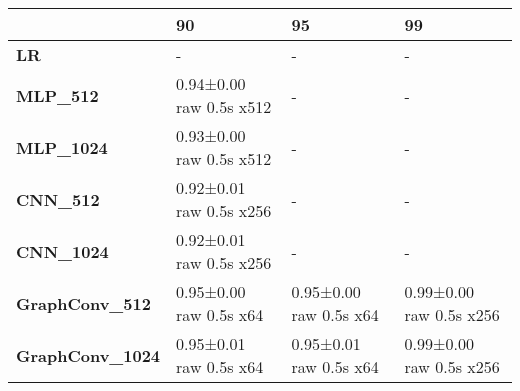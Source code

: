 \begin{tabular}{llll}
\toprule
{} &                       90 &                      95 &                       99 \\
\midrule
\textbf{LR            } &                        - &                       - &                        - \\
\textbf{MLP\_512       } &  0.94±0.00 raw 0.5s x512 &                       - &                        - \\
\textbf{MLP\_1024      } &  0.93±0.00 raw 0.5s x512 &                       - &                        - \\
\textbf{CNN\_512       } &  0.92±0.01 raw 0.5s x256 &                       - &                        - \\
\textbf{CNN\_1024      } &  0.92±0.01 raw 0.5s x256 &                       - &                        - \\
\textbf{GraphConv\_512 } &   0.95±0.00 raw 0.5s x64 &  0.95±0.00 raw 0.5s x64 &  0.99±0.00 raw 0.5s x256 \\
\textbf{GraphConv\_1024} &   0.95±0.01 raw 0.5s x64 &  0.95±0.01 raw 0.5s x64 &  0.99±0.00 raw 0.5s x256 \\
\bottomrule
\end{tabular}
